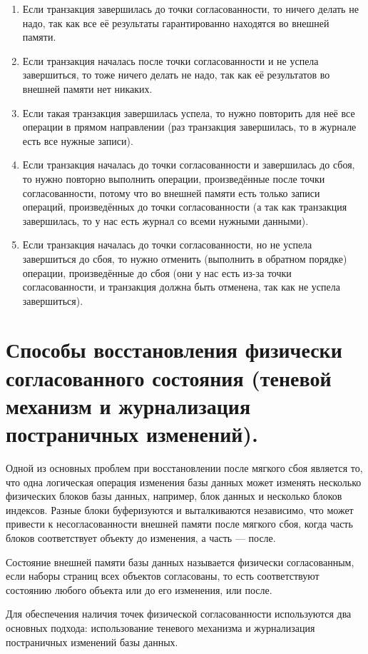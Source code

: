 \documentclass[a4paper,12pt]{article}
\begin{document}
\begin{enumerate}
    \item Если транзакция завершилась до точки согласованности, то ничего делать не надо, так как все её результаты гарантированно находятся во внешней памяти.
    \item Если транзакция началась после точки согласованности и не успела завершиться, то тоже ничего делать не надо, так как её результатов во внешней памяти нет никаких.
    \item Если такая транзакция завершилась успела, то нужно повторить для неё все операции в прямом направлении (раз транзакция завершилась, то в журнале есть все нужные записи).
    \item Если транзакция началась до точки согласованности и завершилась до сбоя, то нужно повторно выполнить операции, произведённые после точки согласованности, потому что во внешней памяти есть только записи операций, произведённых до точки согласованности (а так как транзакция завершилась, то у нас есть журнал со всеми нужными данными).
    \item Если транзакция началась до точки согласованности, но не успела завершиться до сбоя, то нужно отменить (выполнить в обратном порядке) операции, произведённые до сбоя (они у нас есть из-за точки согласованности, и транзакция должна быть отменена, так как не успела завершиться).
\end{enumerate}

\section{Способы восстановления физически согласованного состояния (теневой механизм и журнализация постраничных изменений).}

Одной из основных проблем при восстановлении после мягкого сбоя является то, что одна логическая операция изменения базы данных может изменять несколько физических блоков базы данных, например, блок данных и несколько блоков индексов. Разные блоки буферизуются и выталкиваются независимо, что может привести к несогласованности внешней памяти после мягкого сбоя, когда часть блоков соответствует объекту до изменения, а часть --- после.

Состояние внешней памяти базы данных называется физически согласованным, если наборы страниц всех объектов согласованы, то есть соответствуют состоянию любого объекта или до его изменения, или после.

Для обеспечения наличия точек физической согласованности используются два основных подхода: использование теневого механизма и журнализация постраничных изменений базы данных.
\end{document}
